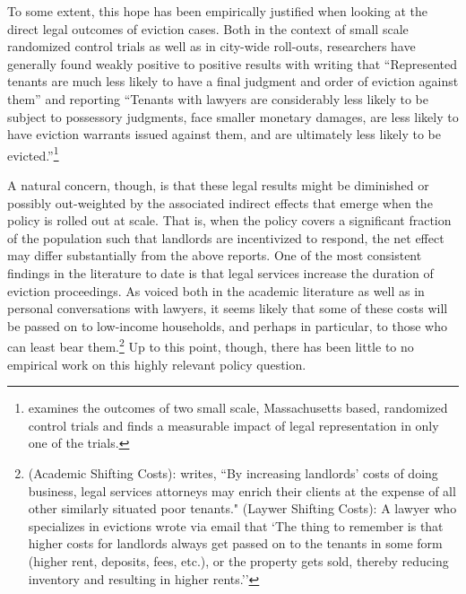 \documentclass[a4paper,12pt]{article}
\begin{document}
To some extent, this hope has been empirically justified when looking at the direct legal outcomes of eviction cases. Both in the context of small scale randomized control trials as well as in city-wide roll-outs, researchers have generally found weakly positive to positive results with \cite{seron2001impact}  writing that ``Represented tenants are much less likely to have a final judgment and order of eviction against them'' and \cite{cassidy2022effects} reporting ``Tenants with lawyers are considerably less likely to be subject to possessory judgments, face smaller monetary damages, are less likely to have eviction warrants issued against them, and are ultimately less likely to be evicted.''\footnote{\cite{greiner2012limits} examines the outcomes of two small scale, Massachusetts based, randomized control trials and finds a measurable impact of legal representation in only one of the trials.} \par 
A natural concern, though, is that these legal results might be diminished or possibly out-weighted by the associated indirect effects that emerge when the policy is rolled out at scale. That is, when the policy covers a significant fraction of the population such that landlords are incentivized to respond, the net effect may differ substantially from the above reports. One of the most consistent findings in the literature to date is that legal services increase the duration of eviction proceedings. As voiced both in the academic literature as well as in personal conversations with lawyers, it seems likely that some of these costs will be passed on to low-income households, and perhaps in particular, to those who can least bear them.\footnote{(Academic Shifting Costs): \cite{gunn1995eviction} writes, ``By increasing landlords' costs of doing business, legal services attorneys may enrich their clients at the expense of all other similarly situated poor tenants." (Laywer Shifting Costs):  A lawyer who specializes in evictions wrote via email that `The thing to remember is that higher costs for landlords always get passed on to the tenants in some form (higher rent, deposits, fees, etc.), or the property gets sold, thereby reducing inventory and resulting in higher rents.''} Up to this point, though, there has been little to no empirical work on this highly relevant policy question. \par 
\end{document}
